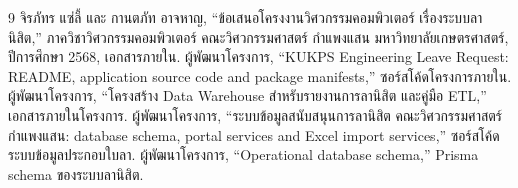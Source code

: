 \begin{thebibliography}{9}
 จิรภัทร แซ่ลี้ และ กานตภัท อาจหาญ, ``ข้อเสนอโครงงานวิศวกรรมคอมพิวเตอร์ เรื่องระบบลานิสิต,'' ภาควิชาวิศวกรรมคอมพิวเตอร์ คณะวิศวกรรมศาสตร์ กำแพงแสน มหาวิทยาลัยเกษตรศาสตร์, ปีการศึกษา 2568, เอกสารภายใน.
 ผู้พัฒนาโครงการ, ``KUKPS Engineering Leave Request: README, application source code and package manifests,'' ซอร์สโค้ดโครงการภายใน.
 ผู้พัฒนาโครงการ, ``โครงสร้าง Data Warehouse สำหรับรายงานการลานิสิต และคู่มือ ETL,'' เอกสารภายในโครงการ.
 ผู้พัฒนาโครงการ, ``ระบบข้อมูลสนับสนุนการลานิสิต คณะวิศวกรรมศาสตร์ กำแพงแสน: database schema, portal services and Excel import services,'' ซอร์สโค้ดระบบข้อมูลประกอบใบลา.
 ผู้พัฒนาโครงการ, ``Operational database schema,'' Prisma schema ของระบบลานิสิต.
\end{thebibliography}
